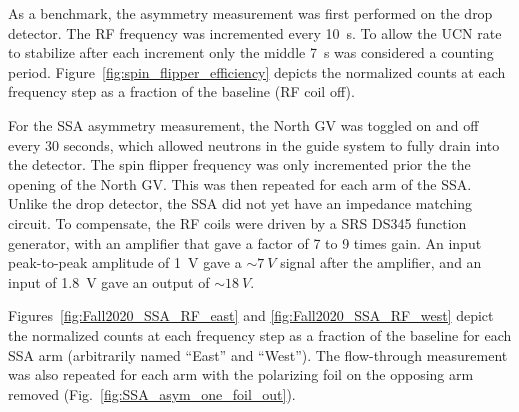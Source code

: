 As a benchmark, the asymmetry measurement was first performed on the drop detector. The RF frequency was incremented every \qty{10}{s}. To allow the UCN rate to stabilize after each increment only the middle \qty{7}{s} was considered a counting period. Figure~\ref{fig:spin_flipper_efficiency} depicts the normalized \ucn counts at each frequency step as a fraction of the baseline (RF coil off). 

For the SSA asymmetry measurement, the North GV was toggled on and off every 30 seconds, which allowed neutrons in the guide system to fully drain into the detector. The spin flipper frequency was only incremented prior the the opening of the North GV. This was then repeated for each arm of the SSA. Unlike the drop detector, the SSA did not yet have an impedance matching circuit. To compensate, the RF coils were driven by a SRS DS345 function generator, with an amplifier that gave a factor of 7 to 9 times gain. An input peak-to-peak amplitude of \qty{1}{V} gave a $\sim\qty{7}{V}$ signal after the amplifier, and an input of \qty{1.8}{V} gave an output of $\sim\qty{18}{V}$.

Figures~\ref{fig:Fall2020_SSA_RF_east} and \ref{fig:Fall2020_SSA_RF_west} depict the  normalized \ucn counts at each frequency step as a fraction of the baseline for each SSA arm (arbitrarily named ``East'' and ``West''). The flow-through measurement was also repeated for each arm with the polarizing foil on the opposing arm removed (Fig.~\ref{fig:SSA_asym_one_foil_out}).





